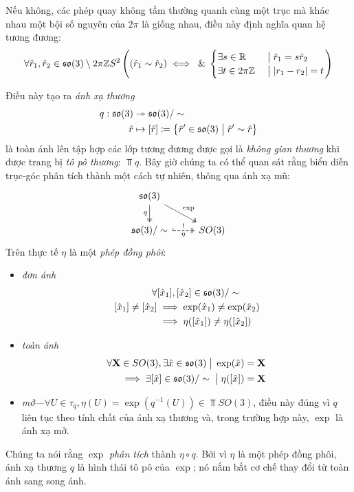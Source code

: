 \documentclass{article}
\theoremstyle{plain}
\theoremstyle{definition}
\begin{document}
    Nếu không, các phép quay không tầm thường quanh cùng một trục mà khác nhau một bội số nguyên của $2\pi$ là giống nhau, điều này định nghĩa quan hệ tương đương: 
    \begin{equation}
       \forall \hat{r}_1, \hat{r}_2\in\mathfrak{so}(3)\setminus2\pi\mathbb{Z} S^2 \left((\hat{r}_1\sim \hat{r}_2)\iff\hspace{1mm}\mathrm{\&}\hspace{1mm}
       \begin{cases}
       \exists s\in \mathbb{R}&\hspace{1mm}\big|\hspace{1mm}\hat{r}_1=s\hat{r}_2\\
       \exists t\in 2\pi\mathbb{Z}&\hspace{1mm}\big|\hspace{1mm}|r_1-r_2|=t
       \end{cases}
       \right)
    \end{equation}
    
    Điều này tạo ra \emph{ánh xạ thương}
    \begin{align}
        q:  \mathfrak{so}(3)&\twoheadrightarrow \mathfrak{so}(3)/\sim \\
        \hat{r} &\mapsto [\hat{r}] \coloneqq \left\{\hat{r}'\in\mathfrak{so}(3)\hspace{1mm}\big|\hspace{1mm} \hat{r}'\sim \hat{r}\right\}
    \end{align}
    là toàn ánh lên tập hợp các lớp tương đương được gọi là \emph{không gian thương} khi được trang bị \emph{tô pô thương}:  $\Top{q}$.  Bây giờ chúng ta có thể quan sát rằng biểu diễn trục-góc phân tích thành một cách tự nhiên, thông qua ánh xạ mũ: 
    \begin{equation}
        \begin{tikzcd}
        \so(3) \arrow[d, two heads, "q"'] \arrow[rd, two heads, "\exp"] & \\
        \so(3)/\sim \arrow[r, dashed, hook, two heads, "!", "\eta"'] & SO(3)
        \end{tikzcd}
    \end{equation}
    Trên thực tế $\eta$ là một \emph{phép đồng phôi}: 
    \begin{itemize}
        \item \emph{đơn ánh}\begin{align*}
            \forall&[\hat{x}_1],[\hat{x}_2]\in\mathfrak{so}(3)/\sim\\
            [\hat{x}_1]\neq [\hat{x}_2]&\implies \exp(\hat{x}_1)\neq \exp(\hat{x}_2)\\
            &\implies \eta([\hat{x}_1])\neq\eta([\hat{x}_2])
        \end{align*}
        \item \emph{toàn ánh}\begin{align*}
            \forall \mathbf{X}\in SO(3), \exists \hat{x}\in\mathfrak{so}(3)\hspace{1mm}\big|\hspace{1mm} \exp(\hat{x})=\mathbf{X}\\
            \implies \exists [\hat{x}]\in\mathfrak{so}(3)/\sim\hspace{1mm}\big|\hspace{1mm} \eta([\hat{x}])=\mathbf{X}
        \end{align*}
        \item \emph{mở}---$\forall U\in\tau_{q}, \eta(U) = \exp(q^{-1}(U))\in \Top{SO(3)}$, điều này đúng vì $q$ liên tục theo tính chất của ánh xạ thương và, trong trường hợp này, $\exp$ là ánh xạ mở\cite[Thm. 3.31]{hall}.
    \end{itemize}
    Chúng ta nói rằng $\exp$ \emph{phân tích} thành $\eta\circ q$.  Bởi vì $\eta$ là một phép đồng phôi, ánh xạ thương $q$ là hình thái tô pô của $\exp$; nó nắm bắt cơ chế thay đổi từ toàn ánh sang song ánh. 
    
\end{document}
